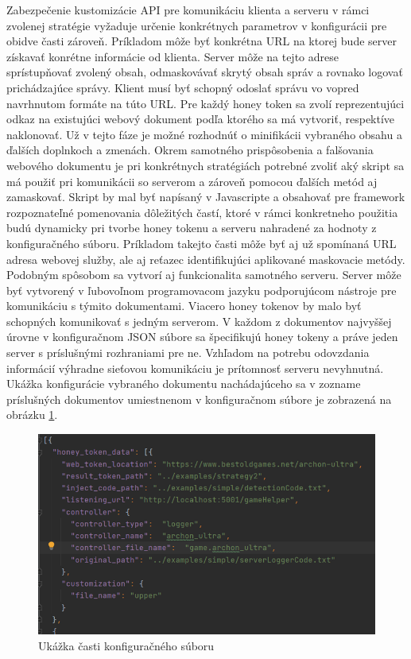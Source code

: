 \documentclass[conference, 11pt,slovak,a4paper,twoside]{IEEEtran}
\begin{document}
Zabezpečenie kustomizácie API pre komunikáciu klienta a serveru v rámci zvolenej stratégie vyžaduje určenie konkrétnych parametrov v konfigurácii pre obidve časti zároveň. Príkladom môže byť konkrétna URL na ktorej bude server získavať konrétne informácie od klienta. Server môže na tejto adrese sprístupňovať zvolený obsah, odmaskovávať skrytý obsah správ a rovnako logovať prichádzajúce správy. Klient musí byť schopný odoslať správu vo vopred navrhnutom formáte na túto URL. Pre každý honey token sa zvolí reprezentujúci odkaz na existujúci webový dokument podľa ktorého sa má vytvoriť, respektíve naklonovať. Už v tejto fáze je možné rozhodnúť o minifikácii vybraného obsahu a ďalších doplnkoch a zmenách. Okrem samotného prispôsobenia a falšovania webového dokumentu je pri konkrétnych stratégiách potrebné zvoliť aký skript sa má použiť pri komunikácii so serverom a zároveň pomocou ďalších metód aj zamaskovať. Skript by mal byť napísaný v Javascripte a obsahovať pre framework rozpoznateľné pomenovania dôležitých častí, ktoré v rámci konkretneho použitia budú dynamicky pri tvorbe honey tokenu a serveru nahradené za hodnoty z konfiguračného súboru. Príkladom takejto časti môže byť aj už spomínaná URL adresa webovej služby, ale aj reťazec identifikujúci aplikované maskovacie metódy. Podobným spôsobom sa vytvorí aj funkcionalita samotného serveru. Server môže byť vytvorený v ľubovoľnom programovacom jazyku podporujúcom nástroje pre komunikáciu s týmito dokumentami. Viacero honey tokenov by malo byť schopných komunikovať s jedným serverom. V každom z dokumentov najvyššej úrovne v konfiguračnom JSON súbore sa špecifikujú honey tokeny a práve jeden server s príslušnými rozhraniami pre ne. Vzhľadom na potrebu odovzdania informácií výhradne sieťovou komunikáciu je prítomnosť serveru nevyhnutná. Ukážka konfigurácie vybraného dokumentu nachádajúceho sa v zozname príslušných dokumentov umiestnenom v konfiguračnom súbore je zobrazená na obrázku \ref{configurationFile}.

\begin{figure}[!t]  %
					\begin{center}
									\includegraphics[width=\linewidth]{fig/configurationFile.png}
									\caption{Ukážka časti konfiguračného súboru}
									\label{configurationFile}
					\end{center}
\end{figure}
\end{document}
